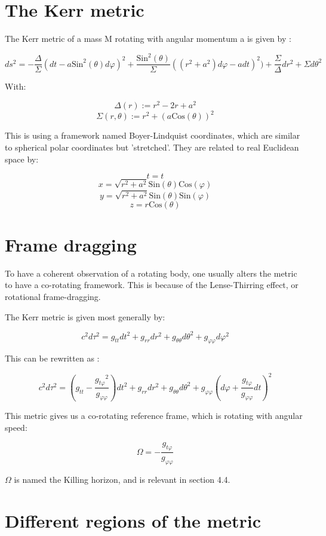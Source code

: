 \documentclass[oneside,openright,frontopenright]{dmathesis}
\begin{document}
\section{The Kerr metric}

	The Kerr metric of a mass M rotating with angular momentum a is given by \cite{raquepas2017topics}:

	\[{ds^{2} = -\frac{\Delta}{\Sigma}(dt-a\mbox{Sin}^2(\theta)d\varphi)^2+\frac{\mbox{Sin}^2(\theta)}{\Sigma}((r^2+a^2)d\varphi-adt)^2)+\frac{\Sigma}{\Delta}dr^2+\Sigma d\theta^2}\]

	With:
	
	\[\Delta(r) := r^2 - 2r + a^2\]
	\[\Sigma(r, \theta) := r^2 +(a\mbox{Cos}(\theta))^2\]

	This is using a framework named Boyer-Lindquist coordinates, which are similar to spherical polar coordinates but 'stretched'. They are related to real Euclidean space by:

	\[t=t\]
	\[x = \sqrt{r^2+a^2}\mbox{Sin}(\theta)\mbox{Cos}(\varphi)\]
	\[y = \sqrt{r^2+a^2}\mbox{Sin}(\theta)\mbox{Sin}(\varphi)\]
	\[z = r\mbox{Cos}(\theta)\]

\section{Frame dragging}

	To have a coherent observation of a rotating body, one usually alters the metric to have a co-rotating framework. This is because of the Lense-Thirring effect, or rotational frame-dragging. 

	The Kerr metric is given most generally by:

	\[c^2d\tau^2 = g_{tt}dt^2+g_{rr}dr^2+g_{\theta\theta}d\theta^2+g_{\varphi\varphi}d\varphi^2\]

	This can be rewritten as \cite{kerrMetric}:

	\[c^2d\tau^2 = \left(g_{tt}-\frac{{g_{t\varphi}}^2}{g_{\varphi\varphi}}\right)dt^2+g_{rr}dr^2+g_{\theta\theta}d\theta^2+g_{\varphi\varphi}\left(d\varphi+\frac{g_{t\varphi}}{g_{\varphi\varphi}}dt\right)^2\]

	This metric gives us a co-rotating reference frame, which is rotating with angular speed:

	\[\Omega = -\frac{g_{t\varphi}}{g_{\varphi\varphi}}\]

	$\Omega$ is named the Killing horizon, and is relevant in section 4.4.

\section{Different regions of the metric}
\end{document}
